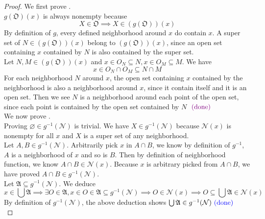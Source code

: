 \documentclass{report}
\begin{document}
\begin{proof}
  We first prove .\\

$g(\mathfrak{O})(x)$ is always nonempty because
\begin{equation}
X \in \mathfrak{O}\implies X\in (g(\mathfrak{O}))(x)
\end{equation}
By definition of $g$, every defined neighborhood around $x$ do contain  $x$. A super set of $N\in (g(\mathfrak{O}))(x)$ belong to $(g(\mathfrak{O}))(x)$, since an open set containing $x$ contained by  $N$ is also contained by the super set.\\

Let $N,M \in (g(\mathfrak{O}))(x)$ and $x \in O_N \subseteq N, x\in O_M \subseteq M$. We have 
\begin{equation}
x \in O_N\cap O_M\subseteq N\cap M
\end{equation}
For each neighborhood $N$ around $x$, the open set containing  $x$ contained by the neighborhood is also a neighborhood around  $x$, since it contain itself and it is an open set.  Then we see $N$ is a neighborhood around each point of the open set, since each point is contained by the open set contained by $N$ $\textcolor{violet}{\text{ (done) }}$\\

We now prove  .\\

Proving $\varnothing \in g^{-1}(\mathcal{N})$ is trivial. We have $X \in g^{-1}(\mathcal{N})$ because  $\mathcal{N}(x)$ is nonempty for all $x$ and  $X$ is a super set of any neighborhood.\\



Let $A,B\in g^{-1}(\mathcal{N})$. Arbitrarily pick $x$ in $A\cap B$, we know by definition of $g^{-1}$,  $A$ is a neighborhood of  $x$ and so is  $B$. Then by definition of neighborhood function, we know $A\cap B\in \mathcal{N}(x)$. Because $x$ is arbitrary picked from $A\cap B$,  we have proved $A\cap B\in g^{-1}(\mathcal{N})$.\\

Let $\mathfrak{A}\subseteq g^{-1}(\mathcal{N})$. We deduce
\begin{equation}
x \in \bigcup \mathfrak{A}\implies \exists O \in \mathfrak{A}, x \in O \in \mathfrak{A}\subseteq g^{-1}(\mathcal{N})\implies O \in \mathcal{N}(x)\implies O \subseteq \bigcup \mathfrak{A} \in \mathcal{N}(x)
\end{equation}
By definition of $g^{-1}(\mathcal{N})$, the above deduction shows $\bigcup \mathfrak{A}\in g^{-1}(\mathcal{N})\textcolor{blue}{\text{ (done) }}$\\



\end{proof}
\end{document}
